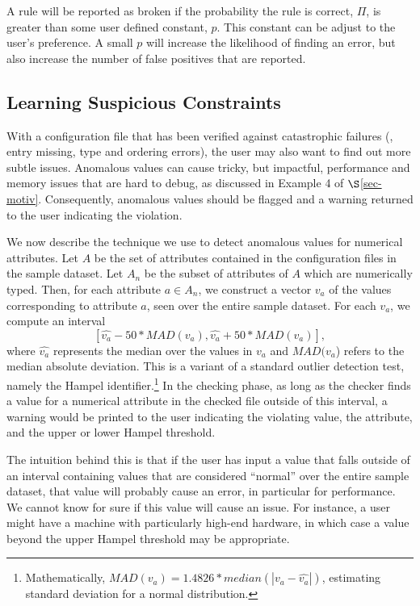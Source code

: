 A rule will be reported as broken if the probability the rule is
correct, $\Pi$, is greater than some user defined constant, $p$. This
constant can be adjust to the user's preference. A small $p$ will
increase the likelihood of finding an error, but also increase the
number of false positives that are reported.



\subsection{Learning Suspicious Constraints}
\label{subsec-constraints}

With a configuration file that has been verified against catastrophic
failures (\eg, entry missing, type and ordering errors), 
the user may also want to find out more subtle issues.
Anomalous values can cause tricky, but impactful, performance and memory
issues that are hard to debug, as discussed in Example 4 of 
$\S$\ref{sec-motiv}. 
Consequently, anomalous values should be flagged and a warning returned
to the user indicating the violation.

We now describe the technique we use to detect anomalous values for 
numerical attributes. Let $A$ be the set of attributes contained in the 
configuration files in the sample dataset. 
Let $A_n$ be the subset of attributes of $A$ which are numerically typed. 
Then, for each attribute $a \in A_n$, we construct a vector $v_a$ of the 
values corresponding to attribute $a$, seen over the entire sample dataset.
For each $v_a$, we compute 
an interval  $$[\hat{v_a} - 50*MAD(v_a), \hat{v_a} + 50*MAD(v_a)],$$ 
where $\hat{v_a}$ represents the median over the values 
in $v_a$ and $MAD(v_a$) refers to the 
median absolute deviation. 
This is a variant of a standard outlier detection test, namely the Hampel identifier.\footnote{Mathematically, $MAD(v_a) = 1.4826* median(|v_a - \hat{v_a}|)$, estimating standard deviation 
for a normal distribution.} 
In the checking phase, as long as the checker finds a value for a numerical 
attribute in the checked file outside of this interval, 
a warning would be printed to the user indicating the violating value, 
the attribute, and the upper or lower Hampel threshold. 

The intuition behind this is that if the user has input a value 
that falls outside of an interval containing values that are considered 
``normal'' over the entire sample dataset, 
that value will probably cause an error, in particular for performance. 
We cannot know for sure if this value will cause an issue. 
For instance, a user might have a machine with 
particularly high-end hardware, 
in which case a value beyond the upper Hampel threshold may be appropriate. 
